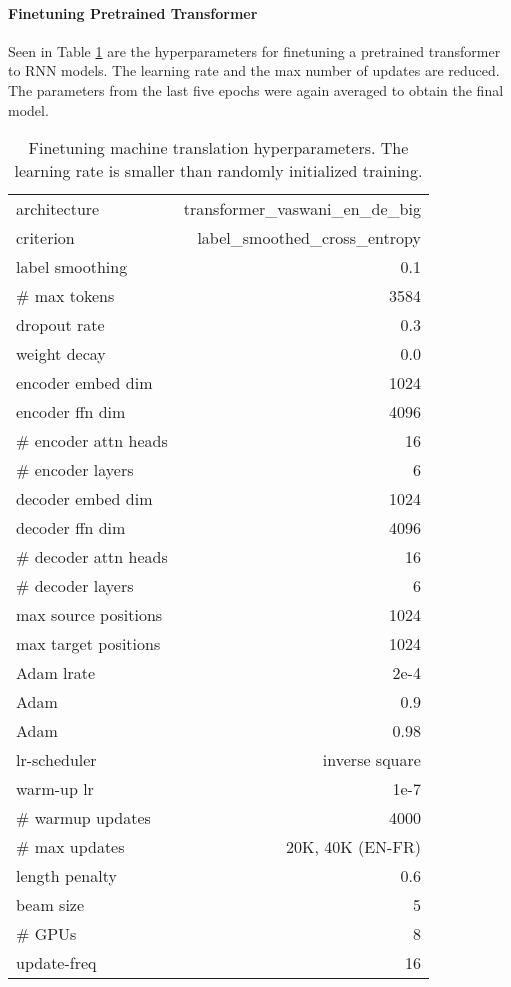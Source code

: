 \documentclass[11pt,a4paper]{article}
\begin{document}
\paragraph{Finetuning Pretrained Transformer}
Seen in Table \ref{tab:mt-ft-hyp} are the hyperparameters for finetuning a pretrained transformer to RNN models. The learning rate and the max number of updates are reduced.
The parameters from the last five epochs were again averaged to obtain the final model.
\begin{table}[h]
\small
\centering
\begin{tabular}{ |l r|}
\hline
architecture & transformer\_vaswani\_en\_de\_big\\
criterion & label\_smoothed\_cross\_entropy\\
label smoothing & 0.1\\
\# max tokens & 3584 \\
dropout rate & 0.3\\
weight decay & 0.0 \\
encoder embed dim  & 1024\\
encoder ffn dim  & 4096\\
\# encoder attn heads & 16\\
\# encoder layers & 6 \\
decoder embed dim  & 1024\\
decoder ffn dim  & 4096\\
\# decoder attn heads & 16\\
\# decoder layers & 6 \\
max source positions & 1024 \\
max target positions & 1024 \\
Adam lrate& 2e-4 \\
Adam & 0.9\\
Adam & 0.98\\
lr-scheduler &  inverse square \\
warm-up lr & 1e-7 \\
\# warmup updates & 4000 \\
\# max updates &  20K, 40K (EN-FR) \\
length penalty & 0.6\\
beam size & 5\\
\# GPUs & 8 \\
update-freq & 16\\
\hline
\end{tabular}
\caption{Finetuning machine translation hyperparameters. The learning rate is smaller than randomly initialized training.}
\label{tab:mt-ft-hyp}
\end{table}
\end{document}
